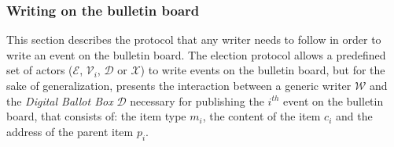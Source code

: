 \subsubsection{Writing on the bulletin board} \label{sec: writing on the bulletin board}
This section describes the protocol that any writer needs to follow in order to write an event on the bulletin board. The election protocol allows a predefined set of actors ($\mathcal{E}$, $\mathcal{V}_i$, $\mathcal{D}$ or $\mathcal{X}$) to write events on the bulletin board, but for the sake of generalization,  presents the interaction between a generic writer $\mathcal{W}$ and the \textit{Digital Ballot Box} $\mathcal{D}$ necessary for publishing the $i^{th}$ event on the bulletin board, that consists of: the item type $m_i$, the content of the item $c_i$ and the address of the parent item $p_i$.

